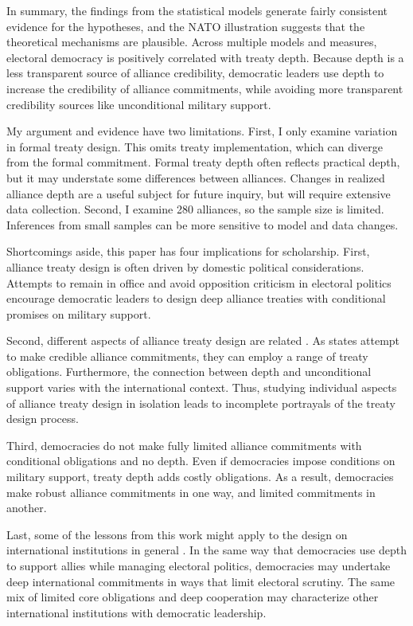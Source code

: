 \documentclass[12pt]{article}
\begin{document}
In summary, the findings from the statistical models generate fairly consistent evidence for the hypotheses, and the NATO illustration suggests that the theoretical mechanisms are plausible. 
Across multiple models and measures, electoral democracy is positively correlated with treaty depth.  
Because depth is a less transparent source of alliance credibility, democratic leaders use depth to increase the credibility of alliance commitments, while avoiding more transparent credibility sources like unconditional military support.


My argument and evidence have two limitations.
First, I only examine variation in formal treaty design. 
This omits treaty implementation, which can diverge from the formal commitment.   
Formal treaty depth often reflects practical depth, but it may understate some differences between alliances. 
Changes in realized alliance depth are a useful subject for future inquiry, but will require extensive data collection.
Second, I examine 280 alliances, so the sample size is limited. 
Inferences from small samples can be more sensitive to model and data changes. 


Shortcomings aside, this paper has four implications for scholarship. 
First, alliance treaty design is often driven by domestic political considerations. 
Attempts to remain in office and avoid opposition criticism in electoral politics encourage democratic leaders to design deep alliance treaties with conditional promises on military support. 


Second, different aspects of alliance treaty design are related \citep{FjelstulReiter2019}. 
As states attempt to make credible alliance commitments, they can employ a range of treaty obligations. 
Furthermore, the connection between depth and unconditional support varies with the international context. 
Thus, studying individual aspects of alliance treaty design in isolation leads to incomplete portrayals of the treaty design process. 


Third, democracies do not make fully limited alliance commitments with conditional obligations and no depth.
Even if democracies impose conditions on military support, treaty depth adds costly obligations.
As a result, democracies make robust alliance commitments in one way, and limited commitments in another. 


Last, some of the lessons from this work might apply to the design on international institutions in general \citep{DownesRocke1995, MartinSimmons1998, Koremenosetal2001, Thompson2010}.
In the same way that democracies use depth to support allies while managing electoral politics, democracies may undertake deep international commitments in ways that limit electoral scrutiny. 
The same mix of limited core obligations and deep cooperation may characterize other international institutions with democratic leadership. 
\end{document}
